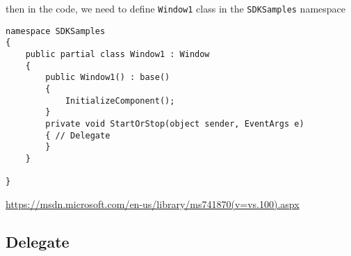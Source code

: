 then in the code, we need to define \verb!Window1! class in the
\verb!SDKSamples! namespace
\begin{lstlisting}
namespace SDKSamples
{
    public partial class Window1 : Window
    {
    	public Window1() : base()
        {
            InitializeComponent();
        }
		private void StartOrStop(object sender, EventArgs e)
        { // Delegate
        }
    }
    
}
\end{lstlisting}
\url{https://msdn.microsoft.com/en-us/library/ms741870(v=vs.100).aspx}

\subsection{Delegate}
\label{sec:Delegate}

